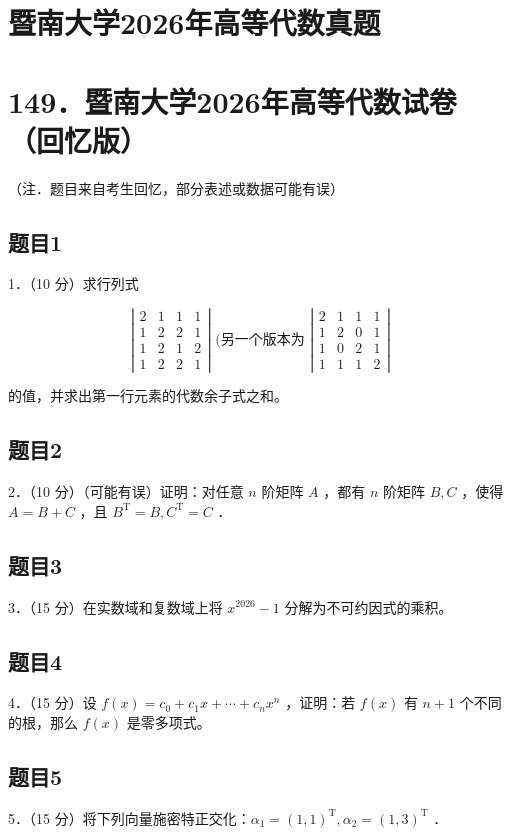 \documentclass{article}
\begin{document}
\section*{暨南大学2026年高等代数真题}
\section*{149．暨南大学2026年高等代数试卷（回忆版）}
（注．题目来自考生回忆，部分表述或数据可能有误）

\subsection{题目1}
1．（10 分）求行列式

\[
\left|\begin{array}{llll}
2 & 1 & 1 & 1 \\
1 & 2 & 2 & 1 \\
1 & 2 & 1 & 2 \\
1 & 2 & 2 & 1
\end{array}\right| \text { (另一个版本为 }\left|\begin{array}{llll}
2 & 1 & 1 & 1 \\
1 & 2 & 0 & 1 \\
1 & 0 & 2 & 1 \\
1 & 1 & 1 & 2
\end{array}\right|
\]

的值，并求出第一行元素的代数余子式之和。

\subsection{题目2}
2．（10 分）（可能有误）证明：对任意 \(n\) 阶矩阵 \(A\) ，都有 \(n\) 阶矩阵 \(B, C\) ，使得 \(A=B+C\) ，且 \(B^{\mathrm{T}}=B, C^{\mathrm{T}}=C\) ．

\subsection{题目3}
3．（15 分）在实数域和复数域上将 \(x^{2026}-1\) 分解为不可约因式的乘积。

\subsection{题目4}
4．（15 分）设 \(f(x)=c_{0}+c_{1} x+\cdots+c_{n} x^{n}\) ，证明：若 \(f(x)\) 有 \(n+1\) 个不同的根，那么 \(f(x)\) 是零多项式。

\subsection{题目5}
5．（15 分）将下列向量施密特正交化：\(\alpha_{1}=(1,1)^{\mathrm{T}}, \alpha_{2}=(1,3)^{\mathrm{T}}\) ．
\end{document}
